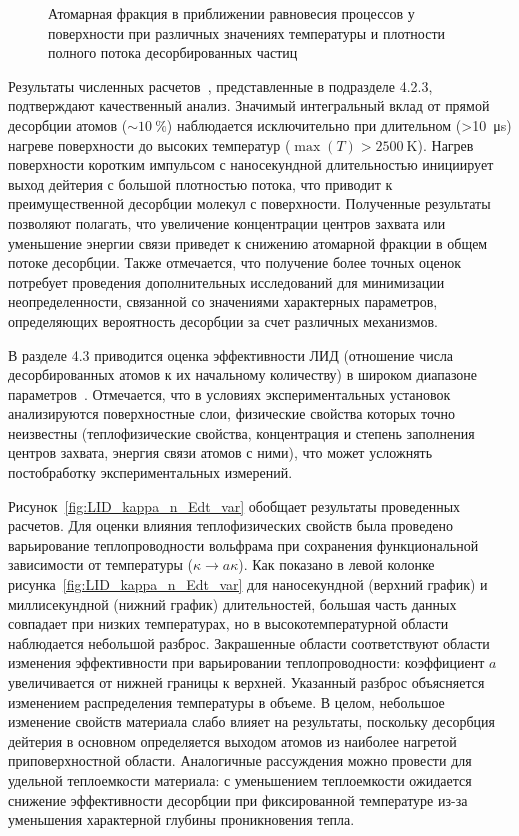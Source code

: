 \begin{figure}[ht]
    \caption{Атомарная фракция в приближении равновесия процессов у поверхности при различных значениях температуры и плотности полного потока десорбированных частиц}\label{fig:atomic_fraction_diagram}
\end{figure}

Результаты численных расчетов~\cite{Kulagin2022b}, представленные в подразделе 4.2.3, подтверждают качественный анализ. Значимый интегральный вклад от прямой десорбции атомов ($\sim\SI{10}{\percent}$) наблюдается исключительно при длительном (>\SI{10}{\micro\second}) нагреве поверхности до высоких температур ($\max(T)>\SI{2500}{\kelvin}$). Нагрев поверхности коротким импульсом с наносекундной длительностью инициирует выход дейтерия с большой плотностью потока, что приводит к преимущественной десорбции молекул с поверхности. Полученные результаты позволяют полагать, что увеличение концентрации центров захвата или уменьшение энергии связи приведет к снижению атомарной фракции в общем потоке десорбции. Также отмечается, что получение более точных оценок потребует проведения дополнительных исследований для минимизации неопределенности, связанной со значениями характерных параметров, определяющих вероятность десорбции за счет различных механизмов.

В разделе 4.3 приводится оценка эффективности ЛИД (отношение числа десорбированных атомов к их начальному количеству) в широком диапазоне параметров~\cite{Kulagin2023}. Отмечается, что в условиях экспериментальных установок анализируются поверхностные слои, физические свойства которых точно неизвестны (теплофизические свойства, концентрация и степень заполнения центров захвата, энергия связи атомов с ними), что может усложнять постобработку экспериментальных измерений. 

Рисунок~\cref{fig:LID_kappa_n_Edt_var} обобщает результаты проведенных расчетов. Для оценки влияния теплофизических свойств была проведено варьирование теплопроводности вольфрама при сохранения функциональной зависимости от температуры (\( \kappa \rightarrow a\kappa \)). Как показано в левой колонке рисунка~\cref{fig:LID_kappa_n_Edt_var} для наносекундной (верхний график) и миллисекундной (нижний график) длительностей, большая часть данных совпадает при низких температурах, но в высокотемпературной области наблюдается небольшой разброс. Закрашенные области соответствуют области изменения эффективности при варьировании теплопроводности: коэффициент \(a\) увеличивается от нижней границы к верхней. Указанный разброс объясняется изменением распределения температуры в объеме. В целом, небольшое изменение свойств материала слабо влияет на результаты, поскольку десорбция дейтерия в основном определяется выходом атомов из наиболее нагретой приповерхностной области. Аналогичные рассуждения можно провести для удельной теплоемкости материала: с уменьшением теплоемкости ожидается снижение эффективности десорбции при фиксированной температуре из-за уменьшения характерной глубины проникновения тепла.

